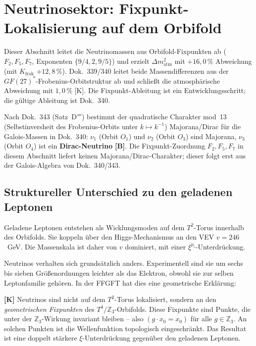 \section{Neutrinosektor: Fixpunkt-Lokalisierung auf dem Orbifold}

Dieser Abschnitt leitet die Neutrinomassen aus Orbifold-Fixpunkten ab
($F_2, F_5, F_7$, Exponenten $\{9/4,2,9/5\}$) und erzielt
$\Delta m^2_\text{atm}$ mit $+16{,}0\,\%$ Abweichung (mit $K_\text{frak}$
$+12{,}8\,\%$). Dok.~339/340 leitet beide Massendifferenzen aus der
$GF(27)^*$-Frobenius-Orbitstruktur ab und schließt die atmosphärische
Abweichung mit $1{,}0\,\%$ [K]. Die Fixpunkt-Ableitung ist ein
Entwicklungsschritt; die gültige Ableitung ist Dok.~340.

Nach Dok.~343 (Satz~D$'''$) bestimmt der quadratische
Charakter mod~13 (Selbstinversheit des Frobenius-Orbits unter $k\mapsto k^{-1}$)
Majorana/Dirac für die Galois-Massen in Dok.~340: $\nu_1$ (Orbit $O_1$)
und $\nu_2$ (Orbit $O_3$) sind Majorana, $\nu_3$ (Orbit $O_4$) ist ein
\textbf{Dirac-Neutrino} \textbf{[B]}. Die Fixpunkt-Zuordnung $F_2,F_5,F_7$ in
diesem Abschnitt liefert keinen Majorana/Dirac-Charakter; dieser folgt erst aus
der Galois-Algebra von Dok.~340/343.

\subsection{Struktureller Unterschied zu den geladenen Leptonen}

Geladene Leptonen entstehen als Wicklungsmoden auf dem $T^2$-Torus
innerhalb des Orbifolds. Sie koppeln über den Higgs-Mechanismus an den
VEV $v = 246$~GeV. Die Massenskala ist daher von $v$ dominiert, mit
einer $\xi^{p_i}$-Unterdrückung.

Neutrinos verhalten sich grundsätzlich anders. Experimentell sind sie
um sechs bis sieben Größenordnungen leichter als das Elektron, obwohl
sie zur selben Leptonfamilie gehören. In der FFGFT hat dies eine
geometrische Erklärung:

\textbf{[K]} Neutrinos sind nicht auf dem $T^2$-Torus lokalisiert,
sondern an den \emph{geometrischen Fixpunkten} des $T^4/\mathbb{Z}_3$-Orbifolds.
Diese Fixpunkte sind Punkte, die unter der $\mathbb{Z}_3$-Wirkung
invariant bleiben -- also $(g \cdot x_0 = x_0)$ für alle
$g \in \mathbb{Z}_3$. An solchen Punkten ist die Wellenfunktion
topologisch eingeschränkt. Das Resultat ist eine doppelt stärkere
$\xi$-Unterdrückung gegenüber den geladenen Leptonen.

